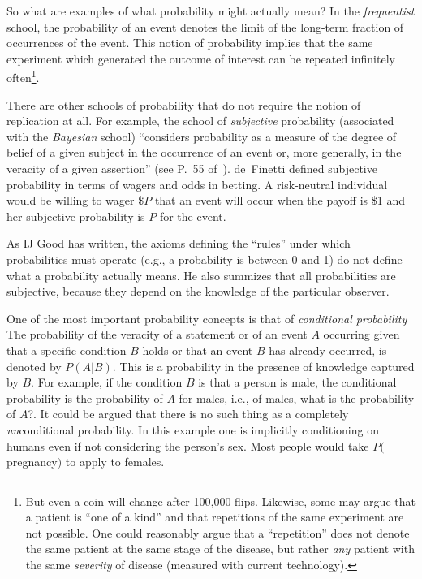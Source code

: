 So what are examples of what probability might actually mean?
In the \emph{frequentist} school, the probability of
an event denotes the limit of the long-term fraction of occurrences
of the event.  This notion of probability implies that the same
experiment which generated the outcome of interest can be repeated
infinitely often\footnote{But even a coin will change after 100,000 flips.
Likewise, some may argue that a patient is ``one of a kind'' and that
repetitions of the same experiment are not possible.  One could
reasonably argue that a ``repetition'' does not denote the same
patient at the same stage of the disease, but rather \emph{any} patient
with the same \emph{severity} of disease (measured with current
technology).}.

There are other schools of probability that do not
require the notion of replication at all.  For example, the school of
\emph{subjective} probability (associated with the \emph{Bayesian}
school) ``considers probability as a measure of the degree of belief
of a given subject in the occurrence of an event or, more generally,
in the veracity of a given assertion'' (see P.\ 55 of~\cite{enc9}).
de~Finetti defined subjective probability in terms of wagers and odds
in betting.  A risk-neutral individual would be willing to wager \$$P$
that an event will occur when the payoff is \$1 and her subjective
probability is $P$ for the event.


As IJ Good has written, the axioms defining the ``rules'' under which probabilities
must operate (e.g., a probability is between 0 and 1) do not define
what a probability actually means.  He also summizes that all
probabilities are subjective, because they depend on the knowledge of
the particular observer.

One of the most important probability concepts is that of 
\emph{conditional probability}  The probability of the veracity of a statement 
or of an event $A$ occurring given that a specific condition $B$ holds or that an event 
$B$ has already occurred, is denoted by $P(A|B)$.  This is a probability in the 
presence of knowledge captured by $B$.  For example, if the condition $B$ is 
that a person is male, the conditional probability is the probability of $A$ 
for males, i.e., of males, what is the probability of $A$?.  It could
be argued that there is no such thing as a completely  
\emph{un}conditional probability.  In this example one is implicitly 
conditioning on humans even if not considering the person's sex.  Most
people would take $P($pregnancy$)$ to apply to females.

